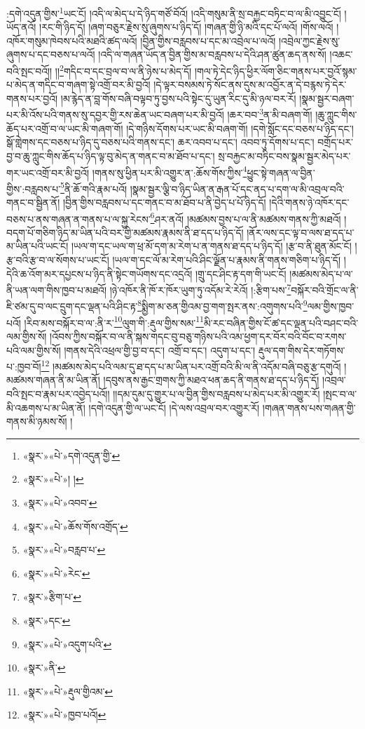 :དགེ་འདུན་གྱིས་\footnote{«སྣར་»«པེ་»དགེ་འདུན་གྱི་}ཡང་ངོ། །འདི་ལ་མེད་པ་དེ་ཉིད་གཙོ་བོའོ། །འདི་གསུམ་ནི་སྲ་བརྐྱང་བཏིང་བ་ལ་མི་འབྱུང་ངོ། །ཡོད་ནའོ། །རང་གི་ཉིད་དོ། །ཞག་བཅུར་རྗེས་སུ་ཞུགས་པ་ཉིད་དོ། །གཞན་གྱི་ཉི་མའི་དང་པོ་ལའོ། །གོས་ལའོ། །འཁོར་གསུམ་ཁེབས་པའི་མཐའི་ཚད་ལའོ། །བྱིན་གྱིས་བརླབས་པ་དང་མ་འབྲེལ་པ་ལའོ། །འབྲེལ་ཀྱང་རྗེས་སུ་ཞུགས་པ་དང་བཅས་པ་ལའོ། །འདི་ལ་གཞན་ཡོད་ན་བྱིན་གྱིས་མ་བརླབས་པ་དེའི་ཤན་ཚུན་ཆད་ནས་སོ། །འཆང་བའི་སྤང་བའོ།། །།\footnote{«སྣར་»«པེ་»། །}གདིང་བ་དང་བྲལ་བ་ལ་ནི་ཉེས་པ་མེད་དོ། །གལ་ཏེ་དེང་ཉིད་ཕྱིར་ལོག་ཅིང་གནས་པར་བྱའོ་སྙམ་པ་མེད་ན་གདིང་བ་གཞག་སྟེ་འགྲོ་བར་མི་བྱའོ། །དེ་ལྟར་བསམས་ཏེ་སོང་ནས་དུས་མ་འབྱོར་ན་དེ་བརྙས་ཏེ་དེར་གནས་པར་བྱའོ། །མ་རྙེད་ན་བླ་གོས་བཞི་བལྟབ་ཏུ་བྱས་པའི་སྟེང་དུ་ཡུན་རིང་དུ་མི་ཉལ་བར་རོ། །སྣམ་སྦྱར་བཞག་པར་མི་འོས་པའི་གནས་སུ་དབྱར་གྱི་རས་ཆེན་ཡང་བཞག་པར་མི་བྱའོ། །ཆར་བབ་\footnote{«སྣར་»«པེ་»འབབ་}ན་མི་བཞག་གོ། །ཆུ་ཀླུང་གིས་ཆོད་པར་འགྲོ་བ་ལ་ཡང་མི་གཞག་གོ། །དེ་གཉིས་དོགས་པར་ཡང་མི་བཞག་གོ། །དགེ་སློང་དང་བཅས་པ་ཉིད་དང་། སྒོ་གླེགས་དང་བཅས་པ་ཉིད་དུ་བཅས་པའི་གནས་དང་། ཆར་འབབ་པ་དང་། འབབ་ཏུ་དོགས་པ་དང་། བགྲོད་པར་བྱ་བ་ཆུ་ཀླུང་གིས་ཆོད་པ་ཉིད་ལྟ་བུ་མེད་ན་གནང་བ་མ་ཐོབ་པ་དང་། སྲ་བརྐྱང་མ་བཏིང་བས་སྣམ་སྦྱར་མེད་པར་གར་ཡང་འགྲོ་བར་མི་བྱའོ། །གནས་སུ་ཕྱིན་པར་མི་འགྱུར་ན་:ཆོས་གོས་ཀྱིས་\footnote{«སྣར་»«པེ་»ཆོས་གོས་འགྲོད་}ཕྱུང་སྟེ་གཞན་ལ་བྱིན་གྱིས་:བརླབས་པ་\footnote{«སྣར་»«པེ་»བརླབ་པ་}ནི་ཆོ་གའི་རྣམ་པའོ། །སྣམ་སྦྱར་ལྕི་བ་ཉིད་ཡིན་ན་རྒན་པོ་དང་ནད་པ་དག་ལ་མི་འབྲལ་བའི་གནང་བ་སྦྱིན་ནོ། །བྱིན་གྱིས་བརླབས་པ་དང་གནང་བ་མ་ཐོབ་པ་ནི་བྱེད་པ་པོ་ཉིད་དོ། །དེའི་གནས་ཉེ་འཁོར་དང་བཅས་པ་ནས་གཞན་ན་གནས་པ་ལ་སྐྱ་རེངས་\footnote{«སྣར་»«པེ་»རེང་}ཤར་ནའོ། །མཚམས་བྱས་པ་ལ་ནི་མཚམས་གནས་ཀྱི་མཐའོ། །བདག་པོ་གཅིག་ཉིད་མ་ཡིན་པའི་བར་གྱི་མཚམས་རྣམས་ནི་ཐ་དད་པ་ཉིད་དོ། །ནོར་ལས་དང་ལྟ་བ་ལས་ཐ་དད་པ་མ་ཡིན་པའི་ཡང་ངོ། །ཡལ་ག་དང་ཡལ་ག་ཕྲ་མོ་དག་མ་རེག་པ་ན་གནས་ཐ་དད་པ་ཉིད་དོ། །རྩ་བ་ནི་ཐུན་མོང་ངོ། །རྩ་བའི་རྩ་བ་ལ་སོགས་པ་ཡང་ངོ། །ཡལ་ག་དང་ལོ་མ་རེག་པའི་ཤིང་ལྗོན་པ་རྣམས་ནི་གནས་གཅིག་པ་ཉིད་དོ། །དེའི་ཆ་འོག་མར་དཔྱངས་པ་ཉིད་ནི་སྟེང་གཡོགས་དང་འདྲའོ། །གྲུ་དང་ཤིང་རྟ་དག་གི་ཡང་ངོ། །མཚམས་མེད་པ་ལ་ནི་ཡན་ལག་གིས་ཁྱབ་པ་མཐའོ། །ཉེ་འཁོར་ནི་ཁོ་ར་ཁོར་ཡུག་ཏུ་འདོམ་རེ་རེའོ། །:རྩིག་པས་\footnote{«སྣར་»རྩིག་པ་}བསྐོར་བའི་གྲོང་ལ་ནི་ཇི་ཙམ་དུ་བ་ལང་དྲུག་དང་ལྡན་པའི་ཤིང་རྟ་\footnote{«སྣར་»དང་}སྨྱིག་མ་ཅན་གྱིའམ་བྱ་གག་སྤར་ནས་:འགུགས་པའི་\footnote{«སྣར་»«པེ་»འདུག་པའི་}ལམ་གྱིས་ཁྱབ་པའོ། །རིབ་མས་བསྐོར་བ་ལ་:ནི་ར་\footnote{«སྣར་»ནི་}ལུག་གི་:རྡུལ་གྱིས་སམ་\footnote{«སྣར་»«པེ་»རྡུལ་གྱིའམ་}མི་རང་བཞིན་གྱིས་ངོ་ཚ་དང་ལྡན་པའི་བཤང་བའི་ལམ་གྱིས་སོ། །འོབས་ཀྱིས་བསྐོར་བ་ལ་ནི་སྐས་གདང་བུ་བཅུ་གཉིས་པའི་འམ་ཕྱག་དར་བོར་བའི་བོང་བ་རགས་པའི་ལམ་གྱིས་སོ། །གནས་དེའི་འཕྲལ་གྱི་བྱ་བ་དང་། འགྲོ་བ་དང་། འདུག་པ་དང་། རྡུལ་དག་གིས་དེར་གཏོགས་པ་:ཁྱབ་བོ།\footnote{«སྣར་»«པེ་»ཁྱབ་པའོ།} །མཚམས་མེད་པའི་ལམ་དུ་ཐ་དད་པ་མ་ཡིན་པར་འགྲོ་བའི་མི་ལ་ནི་འདོམ་བཞི་བཅུ་རྩ་དགུའོ། །མཚམས་གཞན་ནི་མ་ཡིན་ནོ། །དབུས་ནས་རྒྱང་གྲགས་ཀྱི་མཐའ་ཕན་ཆད་ནི་གནས་ཐ་དད་པ་ཉིད་དོ། །འབྲལ་བའི་སྤང་བ་རྣམ་པར་འབྱེད་པའོ།། །།དམ་དུམ་དུ་གྱུར་པ་ལ་བྱིན་གྱིས་བརླབས་པ་མེད་པར་མི་འགྱུར་རོ། །སྤང་བ་ལ་མི་འཆགས་པ་མ་ཡིན་ནོ། །དགེ་འདུན་གྱི་ལ་ཡང་ངོ། །དེ་ལས་འབྲལ་བར་འགྱུར་རོ། །གཞན་གནས་པས་གཞན་གྱི་གནས་མི་ཉམས་སོ། །

